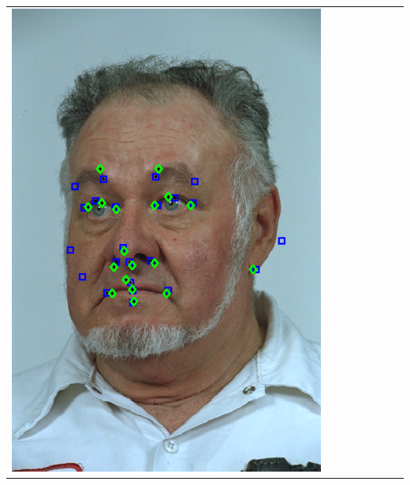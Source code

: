 \documentclass[portrait,final,a0paper,fontscale=0.277]{baposter}
\begin{document}
\begin{poster}
{{\begin{tabular}{@{}rccccccc@{}}
\parbox[c]{0.11\linewidth}{\includegraphics[width=\linewidth]{images/l_ql_success_1.pdf}} &

\end{tabular}}}
\end{poster}
\end{document}
